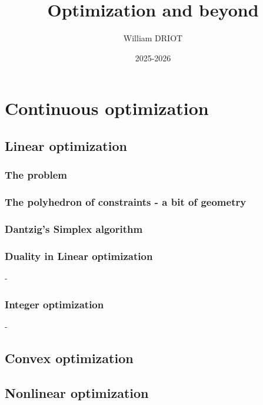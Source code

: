 \documentclass[12pt,openany,oneside]{book}
\title{\textbf{Optimization and beyond}}
\author{William DRIOT}
\date{2025-2026}
\theoremstyle{definition}
\numberwithin{definition}{section}
\numberwithin{theorem}{section}
\numberwithin{corollary}{section}
\numberwithin{proposition}{section}
\numberwithin{notation}{section}
\numberwithin{remark}{section}
\numberwithin{hypothesis}{section}
\numberwithin{example}{section}
\begin{document}
\maketitle

\tableofcontents

\setlength{\parindent}{15pt}
\setlength{\parskip}{6pt}

\newpage



\part{Continuous optimization}

\chapter{Linear optimization}

\section{The problem}

\section{The polyhedron of constraints - a bit of geometry}

\section{Dantzig's Simplex algorithm}

\section{Duality in Linear optimization}-
\section{Integer optimization}-

\chapter{Convex optimization}

\chapter{Nonlinear optimization}
\end{document}

